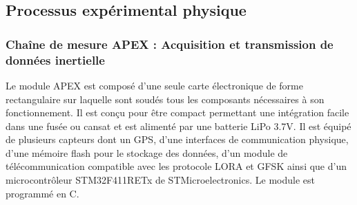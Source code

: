 \subsection{Processus expérimental physique}

\subsubsection{Chaîne de mesure APEX : Acquisition et transmission de données inertielle}

Le module APEX est composé d’une seule carte électronique de forme rectangulaire sur laquelle sont soudés tous les composants
nécessaires à son fonctionnement. Il est conçu pour être compact permettant une intégration facile dans une fusée ou cansat et
est alimenté par une batterie LiPo 3.7V. Il est équipé de plusieurs capteurs dont un \acrshort{GPS}, d’une interfaces de
communication physique, d’une mémoire flash pour le stockage des données, d’un module de télécommunication compatible avec les
protocole \acrshort{LORA} et \acrshort{GFSK} ainsi que d’un microcontrôleur STM32F411RETx de STMicroelectronics. Le module est
programmé en C.

